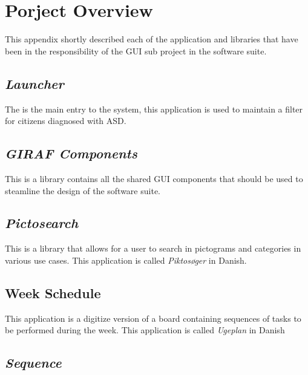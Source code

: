 \chapter{Porject Overview} %
\label{cha:project_overview}


This appendix shortly described each of the application and libraries that have been in the responsibility of the GUI sub project in the \giraf software suite. 

\section{\emph{Launcher}}
\label{sec:app_launcher}

The \launcher is the main entry to the system, this application is used to maintain a filter for citizens diagnosed with ASD.

\section{\emph{GIRAF Components}}
\label{sec:app_giraf_components}

This is a library contains all the shared GUI components that should be used to steamline the design of the \giraf software suite.

\section{\emph{Pictosearch}}
\label{sec:app_pictosearch}

This is a library that allows for a user to search in pictograms and categories in various use cases. This application is called \emph{Piktosøger} in Danish.

\section{Week Schedule}
\label{sec:app_week_schedule}

This application is a digitize version of a board containing sequences of tasks to be performed during the week. This application is called \emph{Ugeplan} in Danish 

\section{\emph{Sequence}}
\label{sec:app_sequence}

